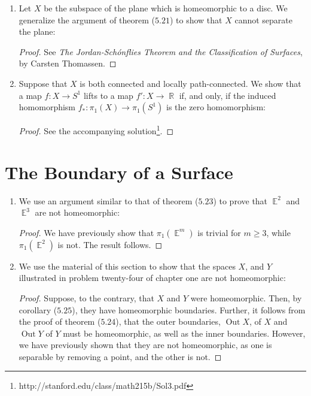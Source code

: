 \documentclass{book}
\DeclareMathOperator*{\R}{\mathbb{R}}
\DeclareMathOperator*{\Out}{\text{Out}}
\DeclareMathOperator*{\E}{\mathbb{E}}
\begin{document}
\begin{enumerate}[(1)]
    \item Let $X$ be the subspace of the plane which is homeomorphic to a disc. We generalize the argument of theorem ($5.21$) to show that $X$ cannot separate the plane: 
        \begin{proof} See \textit{The Jordan-Sch\'onflies Theorem and the Classification of Surfaces}, by Carsten Thomassen. 
        \end{proof}

    \item Suppose that $X$ is both connected and locally path-connected. We show that a map $f: X \rightarrow S^1$ lifts to a map $f': X \rightarrow \R$ if, and only, if the induced homomorphism $f_*: \pi_1(X) \rightarrow \pi_1 (S^1)$ is the zero homomorphism: 
        \begin{proof} See the accompanying solution\footnote{http://stanford.edu/class/math215b/Sol3.pdf}. 
        \end{proof}

\end{enumerate}

\section{The Boundary of a Surface}
\begin{enumerate}[(1)]
    \item We use an argument similar to that of theorem ($5.23$) to prove that $\E^2$ and $\E^3$ are not homeomorphic: 
        \begin{proof} We have previously show that $\pi_1(\E^m)$ is trivial for $m \geq 3$, while $\pi_1(\E^2)$ is not. The result follows. 
        \end{proof}

    \item We use the material of this section to show that the spaces $X$, and $Y$ illustrated in problem twenty-four of chapter one are not homeomorphic: 
        \begin{proof} Suppose, to the contrary, that $X$ and $Y$ were homeomorphic. Then, by corollary ($5.25$), they have homeomorphic boundaries. Further, it follows from the proof of theorem ($5.24$), that the outer boundaries, $\Out X$, of $X$ and $\Out Y$ of $Y$ must be homeomorphic, as well as the inner boundaries. However, we have previously shown that they are not homeomorphic, as one is separable by removing a point, and the other is not. 
        \end{proof} 

\end{enumerate}
\end{document}
